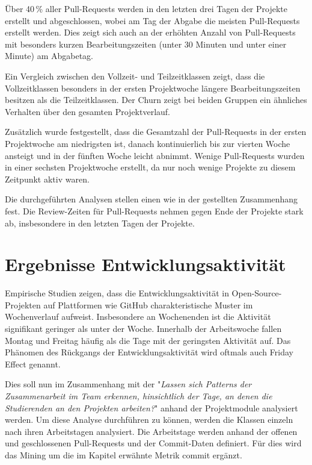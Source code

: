 Über 40\,\% aller Pull-Requests werden in den letzten drei Tagen der Projekte erstellt und abgeschlossen, wobei am Tag der Abgabe die meisten Pull-Requests erstellt werden. Dies zeigt sich auch an der erhöhten Anzahl von Pull-Requests mit besonders kurzen Bearbeitungszeiten (unter 30 Minuten und unter einer Minute) am Abgabetag.

Ein Vergleich zwischen den Vollzeit- und Teilzeitklassen zeigt, dass die Vollzeitklassen besonders in der ersten Projektwoche längere Bearbeitungszeiten besitzen als die Teilzeitklassen. Der Churn zeigt bei beiden Gruppen ein ähnliches Verhalten über den gesamten Projektverlauf.

Zusätzlich wurde festgestellt, dass die Gesamtzahl der Pull-Requests in der ersten Projektwoche am niedrigsten ist, danach kontinuierlich bis zur vierten Woche ansteigt und in der fünften Woche leicht abnimmt. Wenige Pull-Requests wurden in einer sechsten Projektwoche erstellt, da nur noch wenige Projekte zu diesem Zeitpunkt aktiv waren.

Die durchgeführten Analysen stellen einen wie in der  gestellten Zusammenhang fest. Die Review-Zeiten für Pull-Requests nehmen gegen Ende der Projekte stark ab, insbesondere in den letzten Tagen der Projekte.


\section{Ergebnisse Entwicklungs\-aktivi\-tät}
\label{sec:ErgebnisseEntwicklungsaktivtät}
Empirische Studien zeigen, dass die Entwicklungsaktivität in Open-Source-Projek\-ten auf Plattformen wie GitHub charakteristische Muster im Wochenverlauf aufweist. Insbesondere an Wochenenden ist die Aktivität signifikant geringer als unter der Woche. Innerhalb der Arbeitswoche fallen Montag und Freitag häufig als die Tage mit der geringsten Aktivität auf. Das Phänomen des Rückgangs der Entwicklungsaktivität wird oftmals auch Friday Effect genannt. \parencite{claes_programmers_2018}

Dies soll nun im Zusammenhang mit der  "\textit{Lassen sich Patterns der Zusammenarbeit im Team erkennen,
hinsichtlich der Tage, an denen die Studierenden an den Projekten arbeiten?}" anhand der Projektmodule analysiert werden. Um diese Analyse durchführen zu können, werden die Klassen einzeln nach ihren Arbeitstagen analysiert. Die Arbeitstage werden anhand der offenen und geschlossenen Pull-Requests und der Commit-Daten definiert. Für dies wird das Mining um die im Kapitel  erwähnte Metrik commit ergänzt.

